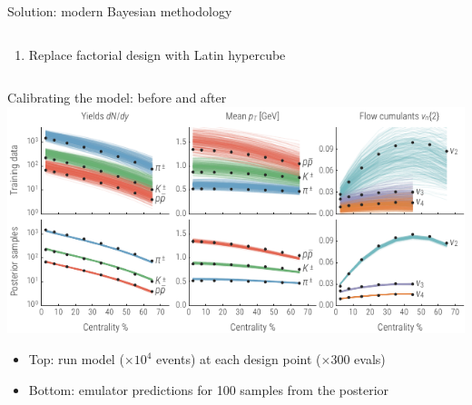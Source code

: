 \documentclass[xcolor=dvipsnames]{beamer}
\begin{document}
\begin{frame}{Solution: modern Bayesian methodology}
    \begin{columns}
        \begin{column}{0.5\textwidth}
            \begin{enumerate}
                \item Replace factorial design with Latin hypercube
            \end{enumerate}
        \end{column}
        \vline
        \begin{column}{0.5\textwidth}
        \end{column}
    \end{columns}
\end{frame}

\begin{frame}{Calibrating the model: before and after}
    \medskip
    \includegraphics{observables_plot} \\
    \bigskip
    \begin{itemize}
        \small
        \item Top: run model ($\times 10^4$ events) at each design point ($\times300$ evals)
        \vspace{0.2 cm}
        \item Bottom: emulator predictions for 100 samples from the posterior
    \end{itemize}
\end{frame}
\end{document}
